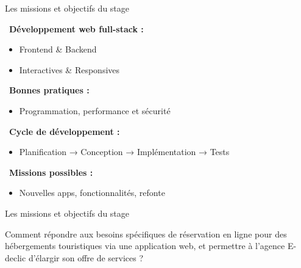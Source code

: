 \documentclass{beamer}
\begin{document}
\begin{frame}{Les missions et objectifs du stage}
	\begin{center}
  		\begin{minipage}{1\textwidth}				

    			\faLaptopCode\ \textbf{Développement web full-stack :}
      		\begin{itemize}
        			\item Frontend \& Backend
        			\item Interactives \& Responsives
      		\end{itemize}

    			\vspace{0.5em}
    			\faCheckCircle\ \textbf{Bonnes pratiques :}
      		\begin{itemize}
        			\item Programmation, performance et sécurité
      		\end{itemize}

    			\vspace{0.5em}
    			\faProjectDiagram\ \textbf{Cycle de développement :}
      		\begin{itemize}
        			\item Planification → Conception → Implémentation → Tests
      		\end{itemize}

    			\vspace{0.5em}
    			\faTasks\ \textbf{Missions possibles :}
      		\begin{itemize}
        			\item Nouvelles apps, fonctionnalités, refonte
      		\end{itemize}
  		\end{minipage}
	\end{center}
	\vfill
\end{frame}

\begin{frame}{Les missions et objectifs du stage}

	Comment répondre aux besoins spécifiques de réservation en ligne pour des hébergements touristiques via une application web, et permettre à l’agence E-declic d’élargir son offre de services ?
			
	\begin{center}
  		\begin{minipage}{0.9\textwidth}
  			\vspace{10cm}
  		\end{minipage}
	\end{center}
	\vfill
\end{frame}
\end{document}
